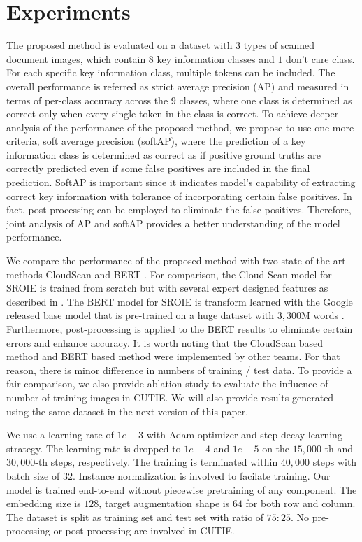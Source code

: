 \documentclass[10pt,twocolumn,letterpaper]{article}
\begin{document}
\section{Experiments}
\label{experiment}
The proposed method is evaluated on a dataset with $3$ types of scanned document images, which contain $8$ key information classes and $1$ don't care class. For each specific key information class, multiple tokens can be included. The overall performance is referred as strict average precision (AP) and measured in terms of per-class accuracy across the $9$ classes, where one class is determined as correct only when every single token in the class is correct. To achieve deeper analysis of the performance of the proposed method, we propose to use one more criteria, soft average precision (softAP), where the prediction of a key information class is determined as correct as if positive ground truths are correctly predicted even if some false positives are included in the final prediction. SoftAP is important since it indicates model's capability of extracting correct key information with tolerance of incorporating certain false positives. In fact, post processing can be employed to eliminate the false positives. Therefore, joint analysis of AP and softAP provides a better understanding of the model performance.

We compare the performance of the proposed method with two state of the art methods CloudScan \cite{cloudscan} and BERT \cite{bert}. For comparison, the Cloud Scan model for SROIE is trained from scratch but with several expert designed features as described in \cite{cloudscan}. The BERT model for SROIE is transform learned with the Google released base model that is pre-trained on a huge dataset with $3,300$M words \cite{bert,bertgit}. Furthermore, post-processing is applied to the BERT results to eliminate certain errors and enhance accuracy. It is worth noting that the CloudScan based method and BERT based method were implemented by other teams. For that reason, there is minor difference in numbers of training / test data. To provide a fair comparison, we also provide ablation study to evaluate the influence of number of training images in CUTIE. We will also provide results generated using the same dataset in the next version of this paper.

We use a learning rate of $1e-3$ with Adam optimizer and step decay learning strategy. The learning rate is dropped to $1e-4$ and $1e-5$ on the $15,000$-th and $30,000$-th steps, respectively. The training is terminated within $40,000$ steps with batch size of $32$. Instance normalization is involved to facilate training. Our model is trained end-to-end without piecewise pretraining of any component. The embedding size is $128$, target augmentation shape is $64$ for both row and column. The dataset is split as training set and test set with ratio of $75:25$. No pre-processing or post-processing are involved in CUTIE.
\end{document}
